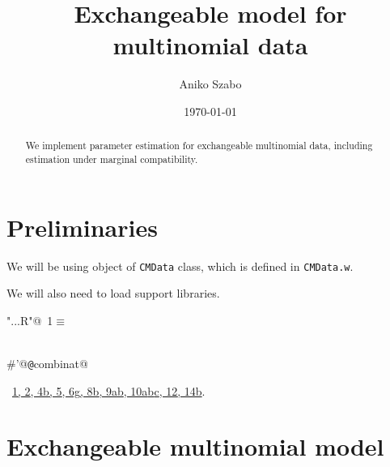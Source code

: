 \documentclass[reqno]{amsart}
\title{Exchangeable model for multinomial data}
\author{Aniko Szabo}
\date{\today}
\renewcommand{\NWtarget}[2]{\hypertarget{#1}{#2}}
\renewcommand{\NWlink}[2]{\hyperlink{#1}{#2}}
\begin{document}
\maketitle


\begin{abstract}
We implement parameter estimation for exchangeable multinomial data, including estimation under marginal compatibility. 
\end{abstract}

\section{Preliminaries}

We will be using object of \texttt{CMData} class, which is defined in \texttt{CMData.w}.

We will also need to load support libraries.

\begin{flushleft} \small
\begin{minipage}{\linewidth}\label{scrap1}\raggedright\small
\NWtarget{nuweb1}{} \verb@"..\R\ExchMultinomial.R"@\nobreak\ {\footnotesize {1}}$\equiv$
\vspace{-1ex}
\begin{list}{}{} \item
\mbox{}\verb@@\\
\mbox{}\verb@#'@{\tt @}\verb@import combinat@\\
\mbox{}\verb@@{\NWsep}
\end{list}
\vspace{-1.5ex}
\footnotesize
\begin{list}{}{\setlength{\itemsep}{-\parsep}\setlength{\itemindent}{-\leftmargin}}
\item \NWtxtFileDefBy\ \NWlink{nuweb1}{1}\NWlink{nuweb2}{, 2}\NWlink{nuweb4b}{, 4b}\NWlink{nuweb5}{, 5}\NWlink{nuweb6g}{, 6g}\NWlink{nuweb8b}{, 8b}\NWlink{nuweb9a}{, 9a}\NWlink{nuweb9b}{b}\NWlink{nuweb10a}{, 10a}\NWlink{nuweb10b}{b}\NWlink{nuweb10c}{c}\NWlink{nuweb12}{, 12}\NWlink{nuweb14b}{, 14b}.

\item{}
\end{list}
\end{minipage}\vspace{4ex}
\end{flushleft}
\section{Exchangeable multinomial model}\label{S:MLE} 
\end{document}
